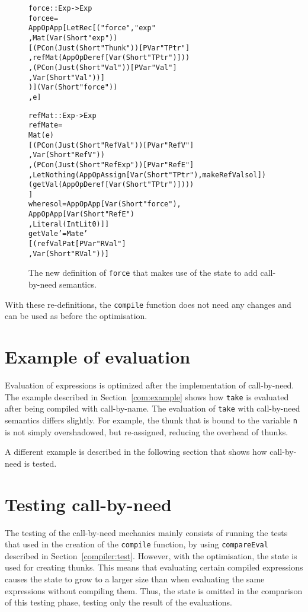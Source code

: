 \begin{figure}
\begin{alltt}
  force :: Exp -> Exp
  force e =
    App OpApp [LetRec [("force", "exp"
                       , Mat (Var (Short "exp"))
                         [(PCon (Just (Short "Thunk")) [PVar "TPtr"]
                          ,refMat (App OpDeref [Var (Short "TPtr")]))
                         ,(PCon (Just (Short "Val")) [PVar "Val"]
                          , Var (Short "Val"))]
                       )] (Var (Short "force"))
              , e]

  refMat :: Exp -> Exp
  refMat e =
    Mat (e)
    [(PCon (Just (Short "RefVal")) [PVar "RefV"]
     ,Var (Short "RefV"))
    ,(PCon (Just (Short "RefExp")) [PVar "RefE"]
     ,Let Nothing (App OpAssign [Var (Short "TPtr"), makeRefVal sol])
       (getVal (App OpDeref [Var (Short "TPtr")])))
    ]
    where sol = App OpApp [Var (Short "force"),
                           App OpApp [Var (Short "RefE")
                                     ,Literal (IntLit 0)]]
          getVal e' = Mat e'
                      [(refValPat [PVar "RVal"]
                       ,Var (Short "RVal"))]
\end{alltt}
\caption{The new definition of \texttt{force} that makes use of the state to add call-by-need semantics.}
\end{figure}
With these re-definitions, the \texttt{compile} function does not need any
changes and can be used as before the optimisation.

\section{Example of evaluation}
Evaluation of expressions is optimized after the implementation of call-by-need.
The example described in Section~\ref{com:example} shows how \texttt{take} is
evaluated after being compiled with call-by-name. The evaluation of \texttt{take}
with call-by-need semantics differs slightly. For example, the thunk that is bound
to the variable \texttt{n} is not simply overshadowed, but re-assigned, reducing
the overhead of thunks.

A different example is described in the following section that shows how
call-by-need is tested.

\section{Testing call-by-need}
The testing of the call-by-need mechanics mainly consists of running the tests
that used in the creation of the \texttt{compile} function, by using
\texttt{compareEval} described in Section~\ref{compiler:test}. However, with
the optimisation, the state is used for creating thunks. This means that
evaluating certain compiled expressions causes the state to grow to a larger
size than when evaluating the same expressions without compiling them. Thus, the
state is omitted in the comparison of this testing phase, testing only the
result of the evaluations.

